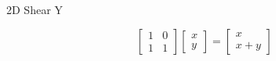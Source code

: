 \documentclass{beamer}
\begin{document}
\begin{frame}{2D Shear Y}

\[ \left[ \begin{array}{cc} 1 & 0 \\ 1 & 1 \end{array} \right] \left[ \begin{array}{c} x \\ y \end{array} \right] =  \left[ \begin{array}{c} x \\ x + y \end{array} \right] \]

\begin{figure}[t]
    \captionsetup[subfloat]{labelformat=empty}
	\centering
\end{figure}

\end{frame}
\end{document}
